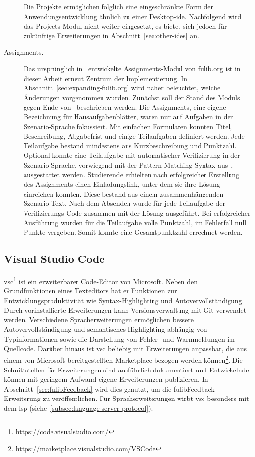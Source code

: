 \begin{description}
    Die Projekte ermöglichen folglich eine eingeschränkte Form der Anwendungsentwicklung ähnlich zu einer Desktop-\ac{ide}.
    Nachfolgend wird das Projects-Modul nicht weiter eingesetzt, es bietet sich jedoch für zukünftige Erweiterungen in Abschnitt~\ref{sec:other-ides} an.
    \item[Assignments.]
    Das ursprünglich in~\cite{bachelor-thesis} entwickelte Assignments-Modul von fulib.org ist in dieser Arbeit erneut Zentrum der Implementierung.
    In Abschnitt~\ref{sec:expanding-fulib.org} wird näher beleuchtet, welche Änderungen vorgenommen wurden.
    Zunächst soll der Stand des Moduls gegen Ende von~\cite{bachelor-thesis} beschrieben werden.
    Die Assignments, eine eigene Bezeichnung für Hausaufgabenblätter, waren nur auf Aufgaben in der Szenario-Sprache fokussiert.
    Mit einfachen Formularen konnten Titel, Beschreibung, Abgabefrist und einige Teilaufgaben definiert werden.
    Jede Teilaufgabe bestand mindestens aus Kurzbeschreibung und Punktzahl.
    Optional konnte eine Teilaufgabe mit automatischer Verifizierung in der Szenario-Sprache, vorwiegend mit der Pattern Matching-Syntax aus~\cite{bachelor-thesis}, ausgestattet werden.
    Studierende erhielten nach erfolgreicher Erstellung des Assignments einen Einladungslink, unter dem sie ihre Lösung einreichen konnten.
    Diese bestand aus einem zusammenhängenden Szenario-Text.
    Nach dem Absenden wurde für jede Teilaufgabe der Verifizierungs-Code zusammen mit der Lösung ausgeführt.
    Bei erfolgreicher Ausführung wurden für die Teilaufgabe volle Punktzahl, im Fehlerfall null Punkte vergeben.
    Somit konnte eine Gesamtpunktzahl errechnet werden.
\end{description}

\subsection{Visual Studio Code}\label{subsec:visual-studio-code}

\ac{vsc}\footnote{\url{https://code.visualstudio.com/}} ist ein erweiterbarer Code-Editor von Microsoft.
Neben den Grundfunktionen eines Texteditors hat er Funktionen zur Entwicklungsproduktivität wie Syntax-Highlighting und Autovervollständigung.
Durch vorinstallierte Erweiterungen kann Versionsverwaltung mit Git verwendet werden.
Verschiedene Spracherweiterungen ermöglichen bessere Autovervollständigung und semantisches Highlighting abhängig von Typinformationen sowie die Darstellung von Fehler- und Warnmeldungen im Quellcode.
Darüber hinaus ist \ac{vsc} beliebig mit Erweiterungen anpassbar, die aus einem von Microsoft bereitgestellten Marketplace bezogen werden können\footnote{\url{https://marketplace.visualstudio.com/VSCode}}.
Die Schnittstellen für Erweiterungen sind ausführlich dokumentiert und Entwickelnde können mit geringem Aufwand eigene Erweiterungen publizieren.
In Abschnitt~\ref{sec:fulibFeedback} wird dies genutzt, um die fulibFeedback-Erweiterung zu veröffentlichen.
Für Spracherweiterungen wirbt \ac{vsc} besonders mit dem \ac{lsp} (siehe~\ref{subsec:language-server-protocol}).

